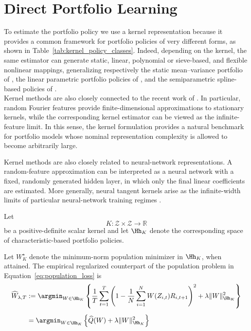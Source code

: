\section{Direct Portfolio Learning}
\label{sec:direct_learning}
To estimate the portfolio policy we use a kernel representation \citet{filipovicschneider2024,nagel2025} because it provides a common framework for
portfolio policies of very different forms, as shown in Table~\ref{tab:kernel_policy_classes}. 
Indeed, depending on the kernel, the same estimator can generate static, linear,
polynomial or sieve-based, and flexible nonlinear mappings, generalizing respectively the static mean--variance portfolio of \citet{brittenjones1999}, the linear parametric portfolio
policies of \citet{brandtsantaclaravalkanov2009}, and the semiparametric
spline-based policies of \citet{caldeirasantostorrent2023}.\\
Kernel methods are also closely connected to the recent work of
\citet{nagel2025,kellymalamud2025}. In particular, random Fourier features
\citep{rahimi2007random} provide finite-dimensional approximations to
stationary kernels, while the corresponding kernel estimator can be viewed as
the infinite-feature limit. In this sense, the kernel formulation provides a
natural benchmark for portfolio models whose nominal representation complexity
is allowed to become arbitrarily large.

Kernel methods are also closely related to neural-network representations.
A random-feature approximation can be interpreted as a neural network with a
fixed, randomly generated hidden layer, in which only the final linear
coefficients are estimated. More generally, neural tangent kernels arise as
the infinite-width limits of particular neural-network training regimes
\citep{jacot2018neural}.

Let
\[
K:\mathscr Z\times\mathscr Z\rightarrow\mathbb R
\]
be a positive-definite scalar kernel and let $\Hh_K$ denote the corresponding
space of characteristic-based portfolio policies.

Let $W_K^\star$ denote the minimum-norm population minimizer in $\Hh_K$,
when attained. 
The empirical regularized counterpart of
the population problem in Equation~\eqref{eq:population_loss} is
\begin{equation}
\begin{aligned}
\widehat W_{\lambda,T}
&:=
\argmin_{W\in\Hh_K}
\left\{
\frac1T\sum_{t=1}^T
\left(
1-\frac1N\sum_{i=1}^N
W(Z_{i,t})R_{i,t+1}
\right)^2
+
\lambda\|W\|_{\Hh_K}^2
\right\}
\\[0.5em]
&=
\argmin_{W\in\Hh_K}
\left\{
\widehat Q(W)
+
\lambda\|W\|_{\Hh_K}^2
\right\}
\end{aligned}
\label{eq:estimator}
\end{equation}


